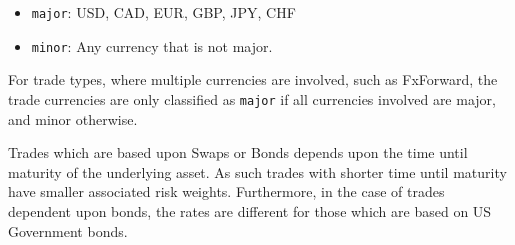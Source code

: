 \begin{itemize}
	\item \texttt{major}: USD, CAD, EUR, GBP, JPY, CHF
	\item \texttt{minor}: Any currency that is not major.
\end{itemize}

For trade types, where multiple currencies are involved, such as FxForward, the trade currencies are only classified as \texttt{major} if all currencies involved are major, and minor otherwise.

Trades which are based upon Swaps or Bonds depends upon the time until maturity of the underlying asset. As such trades with shorter time until maturity have smaller associated risk weights. Furthermore, in the case of trades dependent upon bonds, the rates are different for those which are based on US Government bonds.   

